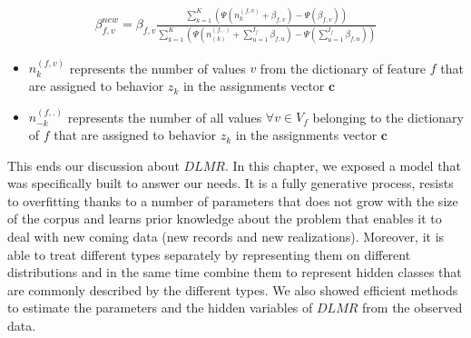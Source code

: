 \begin{equation}\label{betaest}
\begin{split} 
\beta_{f,v}^{new}= \beta_{f,v} \frac{\sum_{k=1}^{K}(\Psi (n^{(f,v)}_{k}+\beta _{f,v})-\Psi (\beta_{f,v}))}{\sum_{k=1}^{K}(\Psi (n^{(f,.)}_{(k)}+\sum_{u=1}^{I_{f}}\beta _{f,u})-\Psi (\sum_{u=1}^{I_{f}}\beta _{f,u}))}
\end{split} 
\end{equation}
\begin{itemize} 
	\item $n^{(f,v)}_{k}$ represents the number of values $v$ from the dictionary of feature $f$ that are assigned to behavior $z_{k}$ in the assignments vector $\mathbf{c}$
	\item $n^{(f,.)}_{-k}$ represents the number of all values $\forall v \in V_{f}$ belonging to the dictionary of $f$ that are assigned to behavior $z_{k}$ in the assignments vector $\mathbf{c}$
\end{itemize} \par

This ends our discussion about $DLMR$. In this chapter, we exposed a model that was specifically built to answer our needs. It is a fully generative process, resists to overfitting thanks to a number of parameters that does not grow with the size of the corpus and learns prior knowledge about the problem that enables it to deal with new coming data (new records and new realizations). Moreover, it is able to treat different types separately by representing them on different distributions and in the same time combine them to represent hidden classes that are commonly described by the different types. We also showed efficient methods to estimate the parameters and the hidden variables of $DLMR$ from the observed data.







